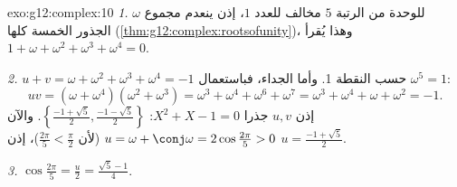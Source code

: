 \begin{solution}{exo:g12:complex:10}
\emph{1.} $\omega$  للوحدة من الرتبة $5$ مخالف للعدد $1$، إذن ينعدم مجموع
الجذور الخمسة كلها (\cref{thm:g12:complex:rootsofunity})، وهذا يُقرأ
$1 + \omega + \omega^2 + \omega^3 + \omega^4 = 0$.

\emph{2.} $u + v = \omega + \omega^2 + \omega^3 + \omega^4 = -1$ حسب النقطة 1.
وأما الجداء، فباستعمال $\omega^5 = 1$:
\[
uv = (\omega + \omega^4)(\omega^2 + \omega^3)
= \omega^3 + \omega^4 + \omega^6 + \omega^7
= \omega^3 + \omega^4 + \omega + \omega^2 = -1 .
\]
إذن $u, v$ جذرا  $X^2 + X - 1 = 0$:
$\left\{\frac{-1+\sqrt5}{2}, \frac{-1-\sqrt5}{2}\right\}$. والآن
$u = \omega + \conj\omega = 2\cos\frac{2\pi}{5} > 0$ (لأن
$\frac{2\pi}{5} < \frac{\pi}{2}$)، إذن $u = \frac{-1 + \sqrt5}{2}$.

\emph{3.} $\cos\frac{2\pi}{5} = \frac u2 = \frac{\sqrt5 - 1}{4}$.
\end{solution}

